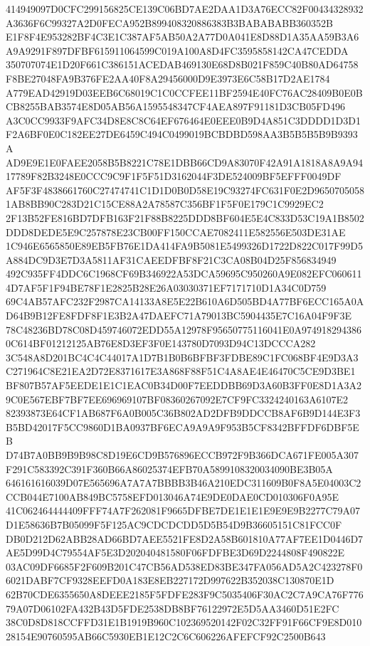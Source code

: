 \documentclass[UTF8,fontset=fandol,zihao=-4,a4paper]{ctexart}
\begin{document}
{{414949097D0CFC299156825CE139C06BD7AE2DAA1D3A76ECC82F00434328932A3636F6C99327A2D0FECA952B899408320886383B3BABABABB360352B
E1F8F4E953282BF4C3E1C387AF5AB50A2A77D0A041E8D88D1A35AA59B3A6A9A9291F897DFBF615911064599C019A100A8D4FC3595858142CA47CEDDA
350707074E1D20F661C386151ACEDAB469130E68D8B021F859C40B80AD64758F8BE27048FA9B376FE2AA40F8A29456000D9E3973E6C58B17D2AE1784
A779EAD42919D03EEB6C68019C1C0CCFEE11BF2594E40FC76AC28409B0E0BCB8255BAB3574E8D05AB56A1595548347CF4AEA897F91181D3CB05FD496
A3C0CC9933F9AFC34D8E8C8C64EF676464E0EEE0B9D4A851C3DDDD1D3D1F2A6BF0E0C182EE27DE6459C494C0499019BCBDBD598AA3B5B5B5B9B9393A
AD9E9E1E0FAEE2058B5B8221C78E1DBB66CD9A83070F42A91A1818A8A9A9417789F82B3248E0CCC9C9F1F5F51D3162044F3DE524009BF5EFFF0049DF
AF5F3F4838661760C27474741C1D1D0B0D58E19C93274FC631F0E2D96507050581AB8BB90C283D21C15CE88A2A78587C356BF1F5F0E179C1C9929EC2
2F13B52FE816BD7DFB163F21F88B8225DDD8BF604E5E4C833D53C19A1B8502DDD8DEDE5E9C257878E23CB00FF150CCAE7082411E582556E503DE31AE
1C946E6565850E89EB5FB76E1DA414FA9B5081E5499326D1722D822C017F99D5A884DC9D3E7D3A5811AF31CAEEDFBF8F21C3CA08B04D25F856834949
492C935FF4DDC6C1968CF69B346922A53DCA59695C950260A9E082EFC0606114D7AF5F1F94BE78F1E2825B28E26A03030371EF7171710D1A34C0D759
69C4AB57AFC232F2987CA14133A8E5E22B610A6D505BD4A77BF6ECC165A0AD64B9B12FE8FDF8F1E3B2A47DAEFC71A79013BC5904435E7C16A04F9F3E
78C48236BD78C08D459746072EDD55A12978F95650775116041E0A9749182943860C614BF01212125AB76E8D3EF3F0E143780D7093D94C13DCCCA282
3C548A8D201BC4C4C44017A1D7B1B0B6BFBF3FDBE89C1FC068BF4E9D3A3C271964C8E21EA2D72E8371617E3A868F88F51C4A8AE4E46470C5CE9D3BE1
BF807B57AF5EEDE1E1C1EAC0B34D00F7EEDDBB69D3A60B3FF0E8D1A3A29C0E567EBF7BF7EE696969107BF08360267092E7CF9FC3324240163A6107E2
82393873E64CF1AB687F6A0B005C36B802AD2DFB9DDCCB8AF6B9D144E3F3B5BD42017F5CC9860D1BA0937BF6ECA9A9A9F953B5CF8342BFFDF6DBF5EB
D74B7A0BB9B9B98C8D19E6CD9B576896ECCB972F9B366DCA671FE005A307F291C583392C391F360B66A86025374EFB70A5899108320034090BE3B05A
646161616039D07E565696A7A7A7BBBB3B46A210EDC311609B0F8A5E04003C2CCB044E7100AB849BC5758EFD013046A74E9DE0DAE0CD010306F0A95E
41C062464444409FFF74A7F262081F9665DFBE7DE1E1E1E9E9E9B2277C79A07D1E58636B7B05099F5F125AC9CDCDCDD5D5B54D9B36605151C81FCC0F
DB0D212D62ABB28AD66BD7AEE5521FE8D2A58B601810A77AF7EE1D0446D7AE5D99D4C79554AF5E3D202040481580F06FDFBE3D69D2244808F490822E
03AC09DF6685F2F609B201C47CB56AD538ED83BE347FA056AD5A2C423278F06021DABF7CF9328EEFD0A183E8EB227172D997622B352038C130870E1D
62B70CDE6355650A8DEEE2185F5FDFE283F9C5035406F30AC2C7A9CA76F77679A07D06102FA432B43D5FDE2538DB8BF76122972E5D5AA3460D51E2FC
38C0D8D818CCFFD31E1B1919B960C102369520142F02C32FF91F66CF9E8D01028154E90760595AB66C5930EB1E12C2C6C606226AFEFCF92C2500B643
}}
\end{document}
